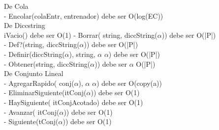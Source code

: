 De Cola \\
 - Encolar(colaEntr, entrenador) debe ser O(log(EC)) \\

De Diccstring \\
iVacio() debe ser O(1)
 - Borrar( string, diccString($\alpha$)) debe ser O(|P|) \\
 - Def?(string,  diccString($\alpha$)) debe ser O(|P|) \\
 - Definir(diccString($\alpha$), string, $\alpha$ $\alpha$) debe ser O(|P|) \\
 - Obtener(string, diccString($\alpha$)) debe ser $\alpha$ O(|P|) \\

De Conjunto Lineal \\
 - AgregarRapido( conj($\alpha$), $\alpha$ $\alpha$) debe ser O(copy(a)) \\
 - EliminarSiguiente(itConj($\alpha$)) debe ser O(1) \\
 - HaySiguiente( itConjAcotado) debe ser O(1) \\
 - Avanzar( itConj($\alpha$)) debe ser O(1) \\
 - Siguiente(tConj($\alpha$)) debe ser O(1) \\

